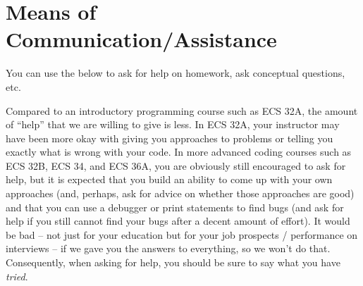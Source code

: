 \documentclass{article}
\begin{document}
\section{Means of Communication/Assistance}

You can use the below to ask for help on homework, ask conceptual questions, etc.

Compared to an introductory programming course such as ECS 32A, the amount of ``help'' that we are willing to give is less. In ECS 32A, your instructor may have been more okay with giving you approaches to problems or telling you exactly what is wrong with your code. In more advanced coding courses such as ECS 32B, ECS 34, and ECS 36A, you are obviously still encouraged to ask for help, but it is expected that you build an ability to come up with your own approaches (and, perhaps, ask for advice on whether those approaches are good) and that you can use a debugger or print statements to find bugs (and ask for help if you still cannot find your bugs after a decent amount of effort). It would be bad -- not just for your education but for your job prospects / performance on interviews -- if we gave you the answers to everything, so we won't do that. Consequently, when asking for help, you should be sure to say what you have \textit{tried}.
\end{document}
